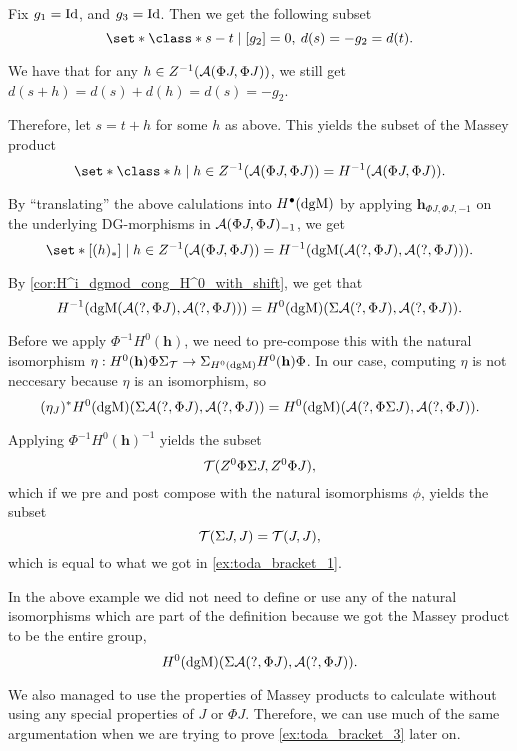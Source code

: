\begin{example}
    Fix \( g_1 = \operatorname{Id} \), and \( g_3 = \operatorname{Id} \). Then we get the following subset
    \[
        \set*{ \class*{ s - t } \mid [g_2] = 0, \:  d(s) = - g_2 = d(t) }.
    \]

    We have that for any \( h \in Z^{-1}({\mathcal{A}}(\Phi J, \Phi J)) \), we still get \( d(s + h) = d(s) + d(h) = d(s) = - g_2 \).

    Therefore, let \( s = t + h \) for some \( h \) as above. This yields the subset of the Massey product
    \[
        \set*{ \class*{ h } \mid h \in Z^{-1}(\Ac(\Phi J, \Phi J)) } = H^{-1}(\Ac(\Phi J, \Phi J)).
    \]

    By ``translating'' the above calulations into \( H^{\bullet}(\operatorname{dgM}) \) by applying \( \mathbf{h}_{\Phi J, \Phi J, -1} \) on the underlying DG-morphisms in \( {\mathcal{A}}(\Phi J, \Phi J)_{-1} \), we get
    \[
        \set*{ [(h)_*] \mid h \in Z^{-1}(\Ac(\Phi J, \Phi J)) } = H^{-1}(\dgM(\Ac(?, \Phi J), \Ac(?, \Phi J))).
    \]

    By \autoref{cor:H^i_dgmod_cong_H^0_with_shift}, we get that
    \[
        H^{-1}(\operatorname{dgM}({\mathcal{A}}(?, \Phi J), {\mathcal{A}}(?, \Phi J))) = H^0(\operatorname{dgM})(\Sigma {\mathcal{A}}(?, \Phi J), {\mathcal{A}}(?, \Phi J)).
    \]

    Before we apply \( \Phi^{-1} H^0(\mathbf{h}) \), we need to pre-compose this with the natural isomorphism \( \eta: H^0(\mathbf{h}) \Phi \Sigma_{{\mathcal{T}}} \to \Sigma_{H^0(\operatorname{dgM})} H^0(\mathbf{h}) \Phi \). In our case, computing \( \eta \) is not neccesary because \( \eta \) is an isomorphism, so
    \[
        (\eta_J)^* H^0(\operatorname{dgM})(\Sigma {\mathcal{A}}(?, \Phi J), {\mathcal{A}}(?, \Phi J)) = H^0(\operatorname{dgM})({\mathcal{A}}(?, \Phi \Sigma J), {\mathcal{A}}(?, \Phi J)).
    \]

    Applying \( \Phi^{-1} H^0(\mathbf{h})^{-1} \) yields the subset
    \[
        {\mathcal{T}}(Z^0 \Phi \Sigma J, Z^0 \Phi J),
    \]
    which if we pre and post compose with the natural isomorphisms \( \phi \), yields the subset
    \[
        {\mathcal{T}}(\Sigma J, J) = {\mathcal{T}}(J, J),
    \]
    which is equal to what we got in \autoref{ex:toda_bracket_1}.
\end{example}

In the above example we did not need to define or use any of the natural isomorphisms which are part of the definition because we got the Massey product to be the entire group,
\[
    H^0(\operatorname{dgM})(\Sigma {\mathcal{A}}(?, \Phi J), {\mathcal{A}}(?, \Phi J)).
\]

We also managed to use the properties of Massey products to calculate without using any special properties of \( J \) or \( \Phi J \). Therefore, we can use much of the same argumentation when we are trying to prove \autoref{ex:toda_bracket_3} later on.

